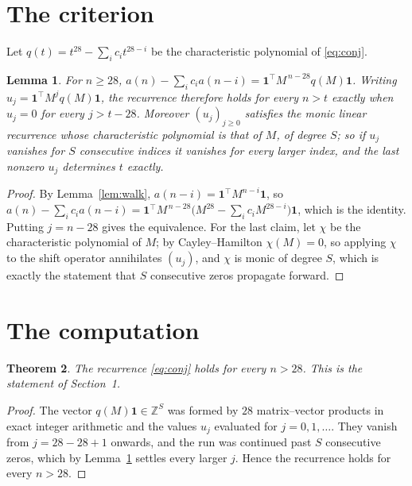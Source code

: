 \documentclass[11pt,a4paper]{article}
\theoremstyle{plain}
\newtheorem{theorem}{Theorem}
\newtheorem{lemma}[theorem]{Lemma}
\theoremstyle{definition}
\begin{document}
\section{The criterion}

Let $q(t)=t^{28}-\sum_i c_i t^{28-i}$ be the characteristic polynomial of
\eqref{eq:conj}.

\begin{lemma}\label{lem:crit}
For $n\ge28$,
$a(n)-\sum_i c_i a(n-i)=\mathbf{1}^{\!\top}M^{\,n-28}q(M)\mathbf{1}$. Writing
$u_j=\mathbf{1}^{\!\top}M^{j}q(M)\mathbf{1}$, the recurrence therefore holds for every
$n>t$ exactly when $u_j=0$ for every $j>t-28$. Moreover $(u_j)_{j\ge0}$ satisfies the
monic linear recurrence whose characteristic polynomial is that of $M$, of degree $S$; so
if $u_j$ vanishes for $S$ consecutive indices it vanishes for every larger index, and the
last nonzero $u_j$ determines $t$ exactly.
\end{lemma}

\begin{proof}
By Lemma~\ref{lem:walk}, $a(n-i)=\mathbf{1}^{\!\top}M^{n-i}\mathbf{1}$, so
$a(n)-\sum_i c_i a(n-i)
=\mathbf{1}^{\!\top}M^{\,n-28}\bigl(M^{28}-\sum_i c_i M^{28-i}\bigr)
\mathbf{1}$, which is the identity. Putting $j=n-28$ gives the equivalence. For the
last claim, let $\chi$ be the characteristic polynomial of $M$; by Cayley--Hamilton
$\chi(M)=0$, so applying $\chi$ to the shift operator annihilates $(u_j)$, and $\chi$ is
monic of degree $S$, which is exactly the statement that $S$ consecutive zeros propagate
forward.
\end{proof}

\section{The computation}

\begin{theorem}
The recurrence \eqref{eq:conj} holds for every $n>28$. This is the statement of
Section~1.
\end{theorem}

\begin{proof}
The vector $q(M)\mathbf{1}\in\mathbb{Z}^{S}$ was formed by $28$ matrix--vector
products in exact integer arithmetic and the values $u_j$ evaluated for
$j=0,1,\dots$. They vanish from $j=28-28+1$ onwards, and the run was continued past
$S$ consecutive zeros, which by Lemma~\ref{lem:crit} settles every larger $j$. Hence the
recurrence holds for every $n>28$.
\end{proof}
\end{document}
